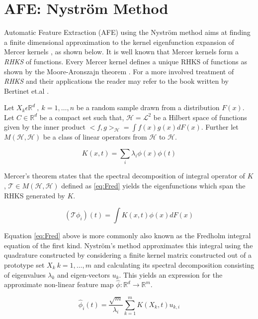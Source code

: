\section{AFE: Nystr\"om Method} \label{app:nystrom}
Automatic Feature Extraction (AFE) using the Nystr\"om method \cite{nystrom} aims at finding a finite dimensional approximation to the kernel eigenfunction expansion of Mercer kernels \cite{Mercer}, as shown below. It is well known that Mercer kernels form a \emph{RHKS} of functions. Every Mercer kernel defines a unique RHKS of functions as shown by the Moore-Aronszajn theorem \cite{N.Aronszjan1950}. For a more involved treatment of \emph{RHKS} and their applications the reader may refer to the book written by Bertinet et.al \cite{RHKSbook}.

Let $X_k \epsilon \mathbb{R}^d \ , \ k = 1, \hdots ,n$ be a random sample drawn from a distribution $F(x)$. Let $C \in \mathbb{R}^d$ be a compact set such that, $\mathcal{H} = \mathcal{L}^2$ be a Hilbert space of functions given by the inner product $<f,g>_{\mathcal{H}} = \int f(x)g(x) dF(x)$. Further let $M(\mathcal{H}, \mathcal{H})$ be a class of linear operators from $\mathcal{H}$ to $\mathcal{H}$.  

\begin{equation}
K(x,t) = \sum_i{\lambda_i \phi(x)\phi(t)}
\end{equation}

Mercer's theorem \cite{Mercer} states that the spectral decomposition of integral operator of $K$, $\mathcal{T} \in M(\mathcal{H},\mathcal{H})$ defined as \ref{eq:Fred} yields the eigenfunctions which span the RHKS generated by $K$. 

\begin{equation} \label{eq:Fred}
(\mathcal{T}\phi_i)(t) = \int K(x,t) \phi(x) dF(x)
\end{equation}

Equation \ref{eq:Fred} above is more commonly also known as the Fredholm integral equation of the first kind. Nystr\"om's method approximates this integral using the quadrature constructed by considering a finite kernel matrix constructed out of a prototype set $X_k \ k = 1, \hdots, m$ and calculating its spectral decomposition consisting of eigenvalues $\lambda_k$ and eigen-vectors $u_k$. This yields an expression for the approximate non-linear feature map $\hat{\phi} : \mathbb{R}^d \longrightarrow \mathbb{R}^m$.

\begin{equation}
\hat{\phi}_{i}(t) = \frac{\sqrt{m}}{\lambda_i}\sum_{k=1}^{m}K(X_k, t)u_{k,i}
\end{equation}
